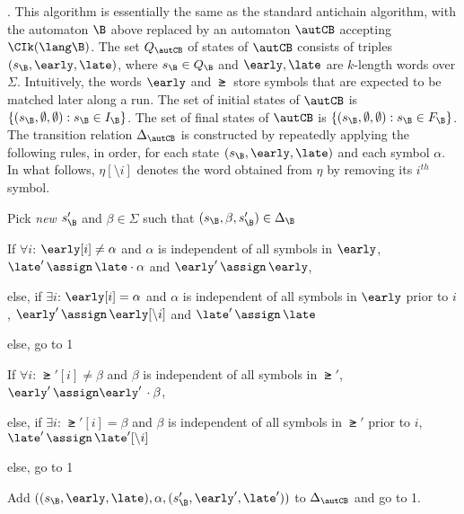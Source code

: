. 
This algorithm is essentially the same as the standard antichain algorithm, with 
the automaton $\B$ above replaced by an automaton 
$\autCB$ accepting $\CIk(\lang \B)$. 
The set $Q_{\autCB}$ of states of $\autCB$ consists of triples $(s_\B, \early, \late)$, 
where $s_\B \in Q_\B$ and $\early, \late$ are $k$-length words over $\Sigma$. 
Intuitively, the words $\early$ and $\late$ store symbols that are expected to be matched later along a run. 
The set of initial states of $\autCB$ is $\{(s_\B,\emptyset,\emptyset): s_\B \in I_\B\}$. 
The set of final states of $\autCB$ is  $\{(s_\B,\emptyset,\emptyset): s_\B \in F_\B\}$. 
The transition relation $\Delta_{\autCB}$ is constructed by repeatedly applying the following rules, in order,  
for each state $(s_\B, \early, \late)$ and each symbol $\alpha$. In what follows, $\eta[\setminus i]$ 
denotes the word obtained from $\eta$ by removing its $i^{th}$ symbol. 
\begin{compactenum}
\item Pick {\em new} $s'_\B$ and $\beta\in\Sigma$ such that $(s_\B, \beta, s_\B') \in \Delta_\B$
\item 
\begin{inparaenum}[(a)]
	\item If $\forall i$: $\early[i] \neq \alpha$ and 
        $\alpha$ is independent of all symbols in $\early$, \\
        $\late' \, \assign \, \late \cdot \alpha$ and $\early' \, \assign \, \early$,
        \item else, if $\exists i$:  $\early[i] = \alpha$ and 
	$\alpha$ is independent of all symbols in $\early$ prior to $i$, 
        $\early' \, \assign \, \early[\setminus i]$ and $\late'\, \assign\, \late$
        \item else, go to 1
   \end{inparaenum}
\item 
\begin{inparaenum}[(a)]
        \item If $\forall i$: $\late'[i] \neq \beta$ and
	$\beta$ is independent of all symbols in $\late'$,\\
        $\early' \, \assign \early' \,\cdot \beta$, 
        \item else, if $\exists i$: $\late'[i] = \beta$ and 
	$\beta$ is independent of all symbols in $\late'$ prior to $i$, 
	$\late' \, \assign \, \late'[\setminus i]$
	\item else, go to 1
\end{inparaenum}
\item Add $((s_\B, \early, \late),\alpha,(s'_\B, \early', \late'))$ to $\Delta_{\autCB}$ and go to 1.
\end{compactenum}


